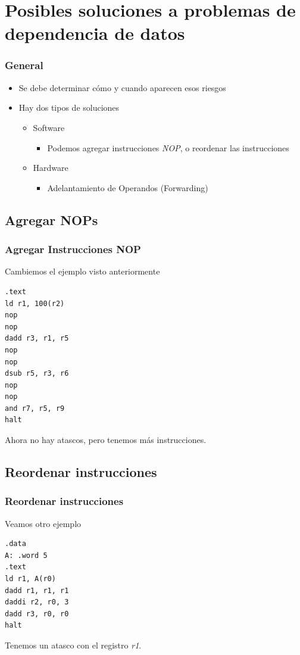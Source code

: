 \documentclass{beamer}
\begin{document}
\section{Posibles soluciones a problemas de dependencia de datos}
\begin{frame}
\frametitle{General}
\begin{itemize}
\item Se debe determinar cómo y cuando aparecen esos riesgos
\item Hay dos tipos de soluciones
\begin{itemize}
\item Software
\begin{itemize}
\item Podemos agregar instrucciones \emph{NOP}, o reordenar las instrucciones
\end{itemize}
\item Hardware
\begin{itemize}
\item Adelantamiento de Operandos (Forwarding)
\end{itemize}
\end{itemize}
\end{itemize}
\end{frame}

\subsection{Agregar NOPs}
\begin{frame}[fragile]
\frametitle{Agregar Instrucciones NOP}

Cambiemos el ejemplo visto anteriormente
\begin{block}{}
\begin{lstlisting}[language=WinMIPS64,basicstyle=\ttfamily,keywordstyle=\color{blue}]
.text
ld r1, 100(r2)
nop
nop
dadd r3, r1, r5
nop
nop
dsub r5, r3, r6
nop
nop
and r7, r5, r9
halt
\end{lstlisting}
\end{block}
Ahora no hay atascos, pero tenemos más instrucciones.
\end{frame}



\subsection{Reordenar instrucciones}
\begin{frame}[fragile]
\frametitle{Reordenar instrucciones}

Veamos otro ejemplo
\begin{block}{}
\begin{lstlisting}[language=WinMIPS64,basicstyle=\ttfamily,keywordstyle=\color{blue}]
.data
A: .word 5
.text
ld r1, A(r0)
dadd r1, r1, r1
daddi r2, r0, 3
dadd r3, r0, r0
halt
\end{lstlisting}
\end{block}
Tenemos un atasco con el registro \emph{r1}.

\end{frame}
\end{document}
